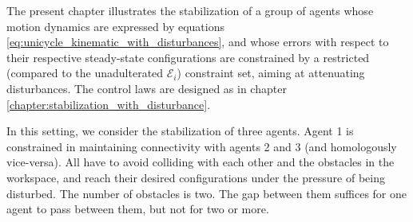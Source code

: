The present chapter illustrates the stabilization of a group of agents whose
motion dynamics are expressed by equations
\eqref{eq:unicycle_kinematic_with_disturbances}, and whose errors with respect
to their respective steady-state configurations are
constrained by a restricted (compared to the unadulterated $\mathcal{E}_{i}$)
constraint set, aiming at attenuating disturbances. The control laws are
designed as in chapter \ref{chapter:stabilization_with_disturbance}.

In this setting, we consider the stabilization of three agents. Agent 1
is constrained in maintaining connectivity with agents 2 and 3 (and
homologously vice-versa). All have to avoid colliding with each other
and the obstacles in the workspace, and reach their desired configurations
under the pressure of being disturbed. The number of obstacles is two. The gap
between them suffices for one agent to pass between them, but not for two or
more.
